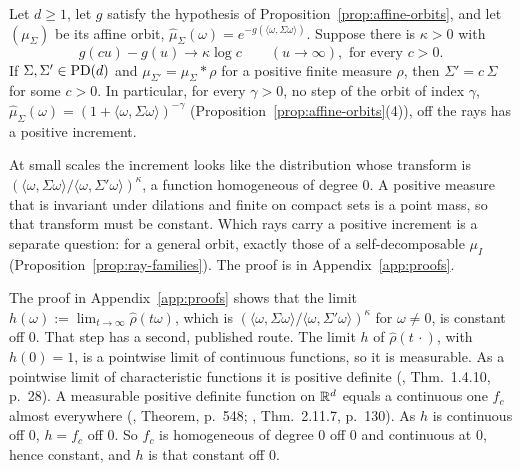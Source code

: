 \begin{proposition}\label{prop:log-orbit-rays}
Let $d \ge 1$, let $g$ satisfy the hypothesis of Proposition~\ref{prop:affine-orbits}, and let $(\mu_\Sigma)$
be its affine orbit, $\widehat\mu_\Sigma(\omega) = e^{-g(\langle\omega,\Sigma\omega\rangle)}$. Suppose
there is $\kappa > 0$ with
\[
  g(cu) - g(u) \to \kappa\log c \qquad (u \to \infty), \text{ for every } c > 0 .
\]
If $\Sigma, \Sigma' \in \mathrm{PD}(d)$ and $\mu_{\Sigma'} = \mu_\Sigma * \rho$ for a positive finite measure
$\rho$, then $\Sigma' = c\,\Sigma$ for some $c > 0$. In particular, for every $\gamma > 0$, no step
of the \Matern{} orbit of index $\gamma$, $\widehat\mu_\Sigma(\omega) = (1 + \langle\omega,\Sigma
\omega\rangle)^{-\gamma}$ (Proposition~\ref{prop:affine-orbits}(4)), off the rays has a positive increment.
\end{proposition}

At small scales the increment looks like the distribution whose transform is
$(\langle\omega,\Sigma\omega\rangle/\langle\omega,\Sigma'\omega\rangle)^\kappa$, a function homogeneous of
degree $0$. A positive measure that is invariant under dilations and finite on compact sets is a point
mass, so that transform must be constant.
Which rays carry a positive increment is a separate question: for a general orbit, exactly those of
a self-decomposable $\mu_I$ (Proposition~\ref{prop:ray-families}).
The proof is in Appendix~\ref{app:proofs}.

\begin{remark}\label{rem:log-orbit-crum}
The proof in Appendix~\ref{app:proofs} shows that the limit
$h(\omega) := \lim_{t\to\infty}\widehat\rho(t\omega)$, which is
$(\langle\omega,\Sigma\omega\rangle/\langle\omega,\Sigma'\omega\rangle)^\kappa$ for $\omega \ne 0$, is
constant off $0$. That step has a second, published route. The limit $h$ of $\widehat\rho(t\,\cdot)$, with
$h(0) = 1$, is a pointwise limit of continuous functions, so it is measurable. As a pointwise limit of
characteristic functions it is positive definite (, Thm.~1.4.10,
p.~28). A measurable positive definite
function on $\mathbb{R}^d$ equals a continuous one $f_c$ almost everywhere (,
Theorem, p.~548; , Thm.~2.11.7, p.~130). As $h$ is continuous off
$0$, $h = f_c$ off $0$. So $f_c$ is homogeneous of degree $0$ off $0$ and continuous at $0$, hence
constant, and $h$ is that constant off $0$.
\end{remark}

